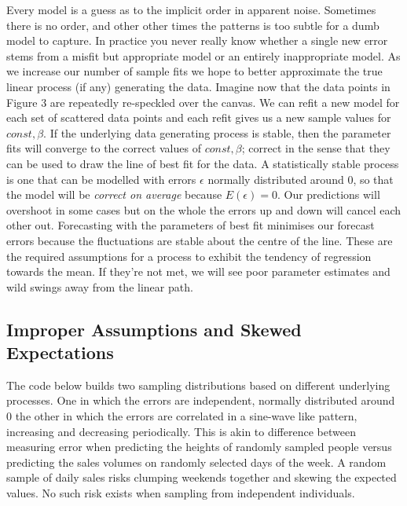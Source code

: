 \documentclass{tufte-handout}
\begin{document}
\noindent Every model is a guess as to the implicit order in apparent noise. Sometimes there is no order, and other other times the patterns is too subtle for a dumb model to capture. In practice you never really know whether a single new error stems from a misfit but appropriate model or an entirely inappropriate model. As we increase our number of sample fits we hope to better approximate the true linear process (if any) generating the data. Imagine now that the data points in Figure 3 are repeatedly re-speckled over the canvas. We can refit a new model for each set of scattered data points and each refit gives us a new sample values for $ const, \beta$. If the underlying data generating process is stable, then the parameter fits will converge to the correct values of $const, \beta$; correct in the sense that they can be used to draw the line of best fit for the data. A statistically stable process is one that can be modelled with errors $\epsilon$ normally distributed around $0$, so that the model will be \textit{ correct on average} because $E(\epsilon) = 0$. Our predictions will overshoot in some cases but on the whole the errors up and down will cancel each other out. Forecasting with the parameters of best fit minimises our forecast errors because the fluctuations are stable about the centre of the line. These are the required assumptions for a process to exhibit the tendency of regression towards the mean. If they're not met, we will see poor parameter estimates and wild swings away from the linear path.

\subsection{Improper Assumptions and Skewed Expectations}

\noindent The code below builds two sampling distributions based on different underlying processes.  One in which the errors are independent, normally distributed around $0$ the other in which the errors are correlated in a sine-wave like pattern, increasing and decreasing periodically. This is akin to difference between measuring error when predicting the heights of randomly sampled people versus predicting the sales volumes on randomly selected days of the week. A random sample of daily sales  risks clumping weekends together and skewing the expected values. No such risk exists when sampling from independent individuals. 
\end{document}

